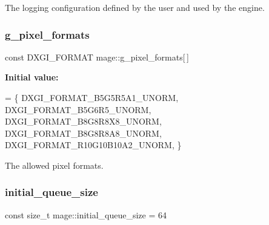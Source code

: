 The logging configuration defined by the user and used by the engine. \hypertarget{namespacemage_a5a4e11b65061c618b85826ab6df480e0}{}\label{namespacemage_a5a4e11b65061c618b85826ab6df480e0} 
\subsubsection{\texorpdfstring{g\+\_\+pixel\+\_\+formats}{g\_pixel\_formats}}
{\footnotesize\ttfamily const D\+X\+G\+I\+\_\+\+F\+O\+R\+M\+AT mage\+::g\+\_\+pixel\+\_\+formats\mbox{[}$\,$\mbox{]}}

{\bfseries Initial value\+:}
\begin{DoxyCode}
= \{
        DXGI\_FORMAT\_B5G5R5A1\_UNORM,    
        DXGI\_FORMAT\_B5G6R5\_UNORM,      
        DXGI\_FORMAT\_B8G8R8X8\_UNORM,    
        DXGI\_FORMAT\_B8G8R8A8\_UNORM,    
        DXGI\_FORMAT\_R10G10B10A2\_UNORM, 
    \}
\end{DoxyCode}
The allowed pixel formats. \hypertarget{namespacemage_a64d189167b7098c519fdcefbe4ac058f}{}\label{namespacemage_a64d189167b7098c519fdcefbe4ac058f} 
\subsubsection{\texorpdfstring{initial\+\_\+queue\+\_\+size}{initial\_queue\_size}}
{\footnotesize\ttfamily const size\+\_\+t mage\+::initial\+\_\+queue\+\_\+size = 64\hspace{0.3cm}{\ttfamily [static]}}

